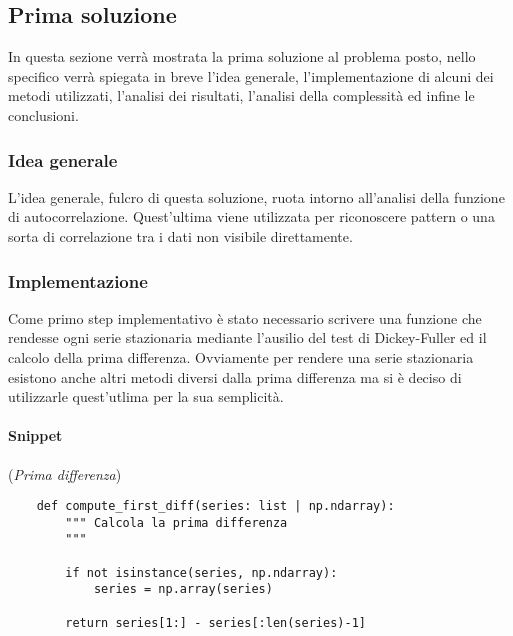 \subsection{Prima soluzione}
In questa sezione verrà mostrata la prima soluzione al problema posto, nello specifico verrà
spiegata in breve l'idea generale, l'implementazione di alcuni dei metodi utilizzati, l'analisi dei
risultati, l'analisi della complessità ed infine le conclusioni.


\subsubsection{Idea generale}
L'idea generale, fulcro di questa soluzione, ruota intorno all'analisi della funzione di autocorrelazione.
Quest'ultima viene utilizzata per riconoscere pattern o una sorta di correlazione tra i dati non
visibile direttamente.

\subsubsection{Implementazione}
Come primo step implementativo è stato necessario scrivere una funzione che rendesse ogni serie stazionaria 
mediante l'ausilio del test di Dickey-Fuller ed il calcolo della prima differenza. Ovviamente
per rendere una serie stazionaria esistono anche altri metodi diversi dalla prima differenza ma 
si è deciso di utilizzarle quest'utlima per la sua semplicità.
\\
\paragraph*{Snippet} (\textit{Prima differenza})
\begin{verbatim}
    def compute_first_diff(series: list | np.ndarray):
        """ Calcola la prima differenza
        """
        
        if not isinstance(series, np.ndarray):
            series = np.array(series)

        return series[1:] - series[:len(series)-1]
\end{verbatim}

